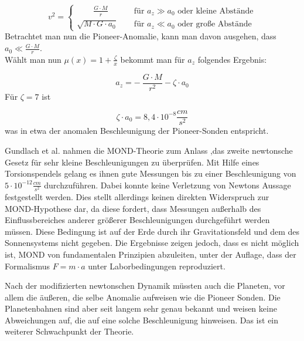 \begin{equation*}
v^{2}=
\begin{cases}
\qquad \frac{G\cdot M}{r} \qquad \quad \, \textrm{für } a_{z}\gg a_{0} \textrm{ oder kleine Abst\"ande} \\
\sqrt{M\cdot G\cdot a_{0}} \qquad \textrm{für } a_{z}\ll a_{0} \textrm{ oder gro{\ss}e Abst\"ande}
\end{cases}
\end{equation*}
Betrachtet man nun die Pioneer-Anomalie, kann man davon
ausgehen, dass $a_{0}\ll \frac{G\cdot M}{r}$. \\
W\"ahlt man nun $\mu (x)=1+\frac{\zeta }{x}$ bekommt
man f\"ur $a_{z}$ folgendes Ergebnis:

\begin{equation}
a_{z}=-\ \frac{G\cdot M}{r^{2}}-\zeta \cdot a_{0}
\end{equation}
F\"ur $\zeta =7$ ist

\begin{equation*}
\zeta \cdot a_{0}=8,4\cdot 10^{-8}\frac{\mathit{cm}}{s^{2}}
\end{equation*}
was in etwa der anomalen Beschleunigung der Pioneer-Sonden entspricht.




Gundlach et al.\cite{Grundlach2007} nahmen die MOND-Theorie zum Anlass ,das zweite
newtonsche Gesetz f\"ur sehr kleine Beschleunigungen zu \"uberpr\"ufen.
Mit Hilfe eines Torsionspendels gelang es ihnen gute Messungen bis zu
einer Beschleunigung von $5\cdot 10^{-12}\frac{\mathit{cm}}{s^{2}}$
durchzuf\"uhren. Dabei konnte keine Verletzung von Newtons Aussage
festgestellt werden. Dies stellt allerdings keinen direkten Widerspruch
zur MOND-Hypothese dar, da diese fordert, dass Messungen au{\ss}erhalb
des Einflussbereiches anderer gr\"o{\ss}erer Beschleunigungen
durchgef\"uhrt werden m\"ussen. Diese Bedingung ist auf der Erde durch
ihr Gravitationsfeld und dem des Sonnensystems nicht gegeben. Die
Ergebnisse zeigen jedoch, dass es nicht m\"oglich ist, MOND von
fundamentalen Prinzipien abzuleiten, unter der Auflage, dass der
Formalismus $F=m\cdot a$ unter Laborbedingungen reproduziert.


Nach der modifizierten newtonschen Dynamik m\"ussten auch die Planeten,
vor allem die \"au{\ss}eren, die selbe Anomalie aufweisen wie die
Pioneer Sonden. Die Planetenbahnen sind aber seit langem sehr genau
bekannt und weisen keine Abweichungen auf, die auf eine solche
Beschleunigung hinweisen. Das ist ein weiterer Schwachpunkt der
Theorie.